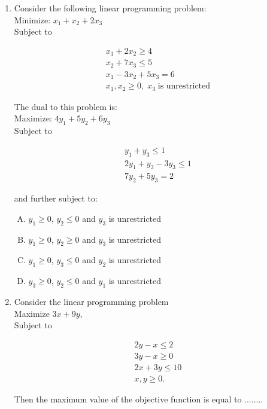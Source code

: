 \documentclass[journal,12pt,twocolumn]{IEEEtran}
\begin{document}
\begin{enumerate}
\item Consider the following linear programming problem: \\
Minimize: $x_1 \! + \! x_2 \! + \! 2x_3$ \\
Subject to
\begin{center}
\begin{align*}
x_1 \! + \! 2x_2 \! \geqslant \!  4 \\
x_2 \! + \! 7x_3 \! \leqslant \! 5 \\
x_1 \! - \! 3x_2 \! + \! 5x_3 \! = \! 6 \\
x_1, \! x_2 \! \geqslant \! 0, \; x_3 \;  \text{is unrestricted} 
\end{align*}
\end{center}
\medskip
The dual to this problem is: \\
Maximize: $4y_1 \! + \! 5y_2 \! + \! 6y_3$ \\
Subject to \\
\begin{center}
\begin{align*}
y_1 \! + y_3 \! \leqslant \! 1 \\
2y_1 \! + y_2 \! - \! 3y_3 \! \leqslant \! 1 \\
7y_2 \! + \! 5y_3 \! = \! 2 
\end{align*}
\end{center}
\smallskip
and further subject to:\\
\begin{enumerate}[(A)]
\setlength\itemsep{1em}
\item $y_1 \! \geqslant \! 0$, $y_2 \! \leqslant \! 0$ and $y_3$ is unrestricted
\item $y_1 \! \geqslant \! 0$, $y_2 \! \geqslant \! 0$ and $y_3$ is unrestricted
\item $y_1 \! \geqslant \! 0$, $y_3 \! \leqslant \! 0$ and $y_2$ is unrestricted
\item $y_3 \! \geqslant \! 0$, $y_2 \! \leqslant \! 0$ and $y_1$ is unrestricted
\end{enumerate}

\item Consider the linear programming problem \\
Maximize $3x \! + \! 9y$, \\
Subject to \\
\begin{center}
\begin{align*}
2y \! - \! x \! \leqslant \! 2 \\
3y \! - \! x \! \geqslant \! 0 \\
2x \! + \! 3y \! \leqslant \! 10 \\
x, \! y \! \geqslant \! 0. 
\end{align*}
\end{center}
\medskip
Then the maximum value of the objective function is equal to ........


\end{enumerate}
\end{document}

